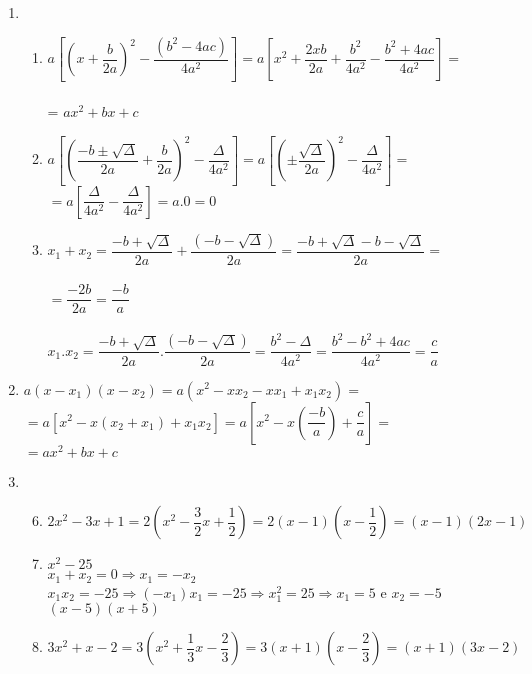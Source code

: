 \documentclass[10pt]{book}
\begin{document}
\begin{enumerate}
\begin{enumerate}
		\end{enumerate}
		\item %
		\begin{enumerate}
			\item %
				$a\left[ \left( x + \dfrac{b}{2a}\right)^2 - \dfrac{\left( b^2 -4ac\right)}{4a^2} \right] = a\left[ x^2 + \dfrac{2xb}{2a} + \dfrac{b^2}{4a^2}- \dfrac{b^2 + 4ac}{4a^2}\right] =$\\\\
				= $\boxed { ax^2 + bx + c}$
			\item %
				$a\left[ \left(\dfrac{-b\pm\sqrt{\Delta}}{2a} + \dfrac{b}{2a}\right)^2 - \dfrac{\Delta}{4a^2}\right] = a\left[\left(\pm\dfrac{\sqrt{\Delta}}{2a}\right)^2 -\dfrac{\Delta}{4a^2}\right]=$\\
				$=a\left[\dfrac{\Delta}{4a^2}- \dfrac{\Delta}{4a^2}\right] = a.0 = \boxed{0}$
			\item %
				$x_{1} + x_{2} = \dfrac{-b+\sqrt{\Delta}}{2a} + \dfrac{(-b-\sqrt{\Delta})}{2a} = \dfrac{-b+\sqrt{\Delta}-b-\sqrt{\Delta}}{2a} = $\\\\
				$=\dfrac{-2b}{2a}=\boxed{\dfrac{-b}{a}}$\\\\
				$x_{1}.x_{2} = \dfrac{-b+\sqrt{\Delta}}{2a}.\dfrac{(-b-\sqrt{\Delta})}{2a} = \dfrac{b^2-\Delta}{4a^2} = \dfrac{b^2-b^2+4ac}{4a^2} = \boxed{\dfrac{c}{a}}$
		\end{enumerate}
		\item %
		$a(x-x_{1})(x-x_{2}) = a(x^2 - xx_{2} - xx_{1} +x_{1}x_{2}) = $\\
		$ = a[x^2 - x(x_{2} + x_{1}) + x_{1}x_{2}] = a\left[x^2 - x\left(\dfrac{-b}{a}\right) + \dfrac{c}{a}\right] =$\\ $
		= \boxed{ax^2+bx+c}$
		\item %
		\begin{enumerate}
			\setcounter{enumii}{5}
				\item %
				$2x^2-3x+1=2(x^2-\dfrac{3}{2}x+\dfrac{1}{2}) = 2(x-1)(x-\dfrac{1}{2})=\boxed{(x-1)(2x-1)}$
				\item %
				$x^2 - 25$\\
				$x_{1} + x_{2} = 0 \Rightarrow x_{1} = -x_{2}$\\
				$x_{1}x_{2} = -25 \Rightarrow (-x_{1})x_{1} = -25 \Rightarrow x_{1}^2 = 25 \Rightarrow x_{1} = 5$ e $x_{2} = -5$\\
				$\boxed{(x - 5)(x + 5)}$
				\item %
				$3x^2 + x - 2 = 3(x^2+\dfrac{1}{3}x-\dfrac{2}{3}) = 3(x+1)(x-\dfrac{2}{3})=\boxed{(x+1)(3x-2)}$\\
				

\end{enumerate}
\end{enumerate}
\end{document}
